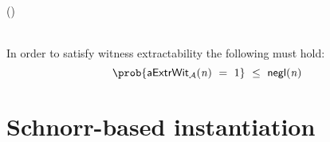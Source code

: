 \begin{definition}
\begin{center}
{\begin{varwidth}{\textwidth}
                \procedure[linenumbering, syntaxhighlight=auto]{$\procNonceOracle{\varSecParam}$} {
                    (\varNonceBob \opSeperate \varRandBob) \opFunResult \procSetupPartSig{\varSecParam} \\
                    \pcreturn \varRandBob
                }
                \procedure[linenumbering, syntaxhighlight=auto]{$\procSignPtOracle{\varMsg}{\varPubKeyAdv}{\varRandAdv}$} {
                    \varSet \opAssign \varSet \opUnion \varMsg \\
                    \pcreturn \procGenPartSig{\varMsg}{\varSecKeyBob}{\varNonceBob}{\varPubKeyAdv}{\varRandAdv}
                }
            \end{varwidth}
        }
    \end{center}
    In order to satisfy witness extractability the following must hold:
    \[ \prob{\procExpExt{\varN} \opEq 1} \opSmEq \funNegl{\varN} \]
\end{definition}

\section{Schnorr-based instantiation}

